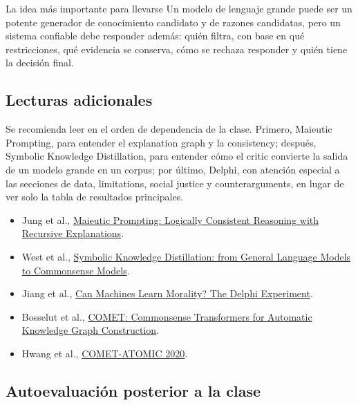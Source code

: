 \documentclass[a4paper]{article}
\begin{document}
\begin{importantbox}{La idea más importante para llevarse}
Un modelo de lenguaje grande puede ser un potente generador de conocimiento candidato y de razones candidatas, pero un sistema confiable debe responder además: quién filtra, con base en qué restricciones, qué evidencia se conserva, cómo se rechaza responder y quién tiene la decisión final.
\end{importantbox}

\subsection{Lecturas adicionales}

Se recomienda leer en el orden de dependencia de la clase. Primero, Maieutic Prompting, para entender el explanation graph y la consistency; después, Symbolic Knowledge Distillation, para entender cómo el critic convierte la salida de un modelo grande en un corpus; por último, Delphi, con atención especial a las secciones de data, limitations, social justice y counterarguments, en lugar de ver solo la tabla de resultados principales.

\begin{itemize}
  \item Jung et al., \href{https://arxiv.org/abs/2205.11822}{Maieutic Prompting: Logically Consistent Reasoning with Recursive Explanations}.
  \item West et al., \href{https://arxiv.org/abs/2110.07178}{Symbolic Knowledge Distillation: from General Language Models to Commonsense Models}.
  \item Jiang et al., \href{https://arxiv.org/abs/2110.07574}{Can Machines Learn Morality? The Delphi Experiment}.
  \item Bosselut et al., \href{https://aclanthology.org/P19-1470/}{COMET: Commonsense Transformers for Automatic Knowledge Graph Construction}.
  \item Hwang et al., \href{https://arxiv.org/abs/2010.05953}{COMET-ATOMIC 2020}.
\end{itemize}

\subsection{Autoevaluación posterior a la clase}
\end{document}
